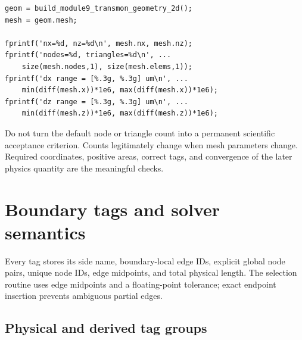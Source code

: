 \documentclass[11pt]{article}
\begin{document}
\begin{lstlisting}[style=projectmatlab]
geom = build_module9_transmon_geometry_2d();
mesh = geom.mesh;

fprintf('nx=%d, nz=%d\n', mesh.nx, mesh.nz);
fprintf('nodes=%d, triangles=%d\n', ...
    size(mesh.nodes,1), size(mesh.elems,1));
fprintf('dx range = [%.3g, %.3g] um\n', ...
    min(diff(mesh.x))*1e6, max(diff(mesh.x))*1e6);
fprintf('dz range = [%.3g, %.3g] um\n', ...
    min(diff(mesh.z))*1e6, max(diff(mesh.z))*1e6);
\end{lstlisting}

Do not turn the default node or triangle count into a permanent scientific acceptance criterion. Counts legitimately change when mesh parameters change. Required coordinates, positive areas, correct tags, and convergence of the later physics quantity are the meaningful checks.

\section{Boundary tags and solver semantics}

Every tag stores its side name, boundary-local edge IDs, explicit global node pairs, unique node IDs, edge midpoints, and total physical length. The selection routine uses edge midpoints and a floating-point tolerance; exact endpoint insertion prevents ambiguous partial edges.

\subsection{Physical and derived tag groups}
\end{document}
